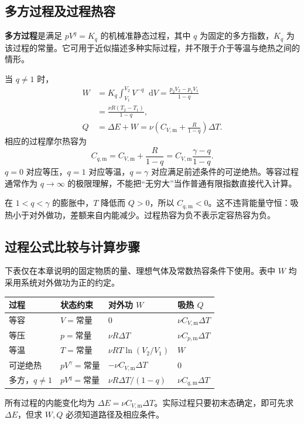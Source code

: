 \documentclass[UTF8,fontset=none,zihao=-4,a4paper]{ctexart}
\newcommand{\term}[1]{\textbf{#1}}
\newcommand{\dd}{\mathop{}\!\mathrm{d}}
\begin{document}
\subsection{多方过程及过程热容}
\term{多方过程}是满足 $pV^q=K_q$ 的机械准静态过程，其中 $q$ 为固定的多方指数，$K_q$ 为该过程的常量。它可用于近似描述多种实际过程，并不限于介于等温与绝热之间的情形。

当 $q\ne1$ 时，
\begin{align*}
 W&=K_q\int_{V_1}^{V_2}V^{-q}\dd V
 =\frac{p_2V_2-p_1V_1}{1-q}\\
 &=\frac{\nu R(T_2-T_1)}{1-q},\\
 Q&=\Delta E+W
 =\nu\left(C_{V,\mathrm m}+\frac{R}{1-q}\right)\Delta T.
\end{align*}
相应的过程摩尔热容为
\[
 C_{q,\mathrm m}=C_{V,\mathrm m}+\frac R{1-q}
 =C_{V,\mathrm m}\frac{\gamma-q}{1-q}.
\]
$q=0$ 对应等压，$q=1$ 对应等温，$q=\gamma$ 对应满足前述条件的可逆绝热。等容过程通常作为 $q\to\infty$ 的极限理解，不能把“无穷大”当作普通有限指数直接代入计算。

在 $1<q<\gamma$ 的膨胀中，$T$ 降低而 $Q>0$，所以 $C_{q,\mathrm m}<0$。这不违背能量守恒：吸热小于对外做功，差额来自内能减少。过程热容为负不表示定容热容为负。

\subsection{过程公式比较与计算步骤}
下表仅在本章说明的固定物质的量、理想气体及常数热容条件下使用。表中 $W$ 均采用系统对外做功为正的约定。
\begin{center}
\small
\begin{tabularx}{\linewidth}{l Y Y Y}
\toprule
过程 & 状态约束 & 对外功 $W$ & 吸热 $Q$\\
\midrule
等容 & $V=\text{常量}$ & $0$ & $\nu C_{V,\mathrm m}\Delta T$\\
等压 & $p=\text{常量}$ & $\nu R\Delta T$ & $\nu C_{p,\mathrm m}\Delta T$\\
等温 & $T=\text{常量}$ & $\nu RT\ln(V_2/V_1)$ & $W$\\
可逆绝热 & $pV^\gamma=\text{常量}$ & $-\nu C_{V,\mathrm m}\Delta T$ & $0$\\
多方，$q\ne1$ & $pV^q=\text{常量}$ & $\nu R\Delta T/(1-q)$ & $\nu C_{q,\mathrm m}\Delta T$\\
\bottomrule
\end{tabularx}
\end{center}
所有过程的内能变化均为 $\Delta E=\nu C_{V,\mathrm m}\Delta T$。实际过程只要初末态确定，即可先求 $\Delta E$，但求 $W,Q$ 必须知道路径及相应条件。
\end{document}
